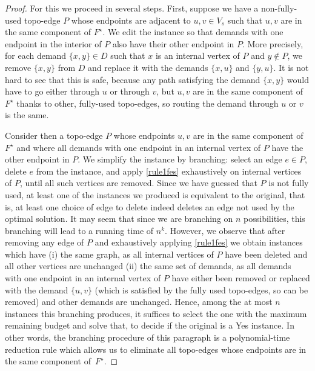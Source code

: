 \documentclass[a4paper]{article}
\theoremstyle{plain}
\begin{document}
\begin{proof}
For this we proceed in several steps.  First, suppose we have a non-fully-used
topo-edge $P$ whose endpoints are adjacent to $u,v\in V_s$ such that $u,v$ are
in the same component of $F^\star$. We edit the instance so that demands with one
endpoint in the interior of $P$ also have their other endpoint in $P$. More
precisely, for each demand $\{x,y\}\in D$ such that $x$ is an internal vertex
of $P$ and $y\not\in P$, we remove $\{x,y\}$ from $D$ and replace it with the
demands $\{x,u\}$ and $\{y,u\}$. It is not hard to see that this is safe,
because any path satisfying the demand $\{x,y\}$ would have to go either
through $u$ or through $v$, but $u,v$ are in the same component of $F^\star$ thanks
to other, fully-used topo-edges, so routing the demand through $u$ or $v$ is
the same.

Consider then a topo-edge $P$ whose endpoints $u,v$ are in the same component
of $F^\star$ and where all demands with one endpoint in an internal vertex of $P$
have the other endpoint in $P$. We simplify the instance by branching: select
an edge $e\in P$, delete $e$ from the instance, and apply \ref{rule1fes} exhaustively
on internal vertices of $P$, until all such vertices are removed.  Since we
have guessed that $P$ is not fully used, at least one of the instances we
produced is equivalent to the original, that is, at least one choice of edge to
delete indeed deletes an edge not used by the optimal solution. It may seem
that since we are branching on $n$ possibilities, this branching will lead to a
running time of $n^k$.  However, we observe that after removing any edge of $P$
and exhaustively applying \ref{rule1fes} we obtain instances which have (i)
the same graph, as all internal vertices of $P$ have been deleted and all other
vertices are unchanged (ii) the same set of demands, as all demands with one
endpoint in an internal vertex of $P$ have either been removed or replaced with
the demand $\{u,v\}$ (which is satisfied by the fully used topo-edges, so can
be removed) and other demands are unchanged.  Hence, among the at most $n$
instances this branching produces, it suffices to select the one with the
maximum remaining budget and solve that, to decide if the original is a Yes
instance. In other words, the branching procedure of this paragraph is a
polynomial-time reduction rule which allows us to eliminate all topo-edges
whose endpoints are in the same component of~$F^\star$.


\end{proof}
\end{document}
